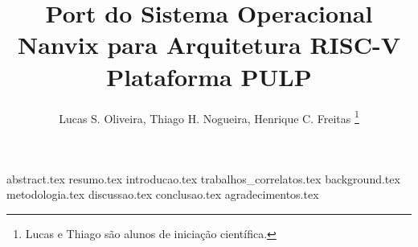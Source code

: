 \documentclass[12pt]{article}
\title{Port do Sistema Operacional Nanvix para Arquitetura RISC-V Plataforma PULP}
\author{
       {Lucas S. Oliveira, Thiago H. Nogueira, Henrique C. Freitas}
       \thanks{Lucas e Thiago são alunos de iniciação científica.}
}
\begin{document}
    \maketitle

    {abstract.tex} %
    {resumo.tex} %
    {introducao.tex} %
    {trabalhos_correlatos.tex} %
    {background.tex} %
    {metodologia.tex} %
    {discussao.tex} %
    {conclusao.tex} %
    {agradecimentos.tex} %
    
    
    
\end{document}
